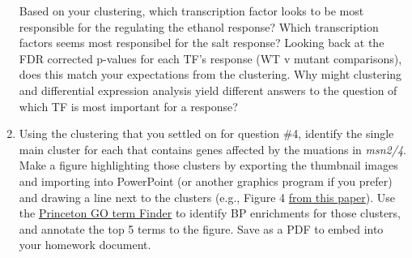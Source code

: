 \documentclass[
]{book}
\begin{document}
\begin{enumerate}
  Based on your clustering, which transcription factor looks to be most responsible for the regulating the ethanol response? Which transcription factors seems most responsibel for the salt response? Looking back at the FDR corrected p-values for each TF's response (WT v mutant comparisons), does this match your expectations from the clustering. Why might clustering and differential expression analysis yield different answers to the question of which TF is most important for a response?
\item
  Using the clustering that you settled on for question \#4, identify the single main cluster for each that contains genes affected by the muations in \emph{msn2/4}. Make a figure highlighting those clusters by exporting the thumbnail images and importing into PowerPoint (or another graphics program if you prefer) and drawing a line next to the clusters (e.g., Figure 4 \href{https://pubmed.ncbi.nlm.nih.gov/32027144/}{from this paper}). Use the \href{https://go.princeton.edu/cgi-bin/GOTermFinder}{Princeton GO term Finder} to identify BP enrichments for those clusters, and annotate the top 5 terms to the figure. Save as a PDF to embed into your homework document.
\end{enumerate}

  
\end{document}
